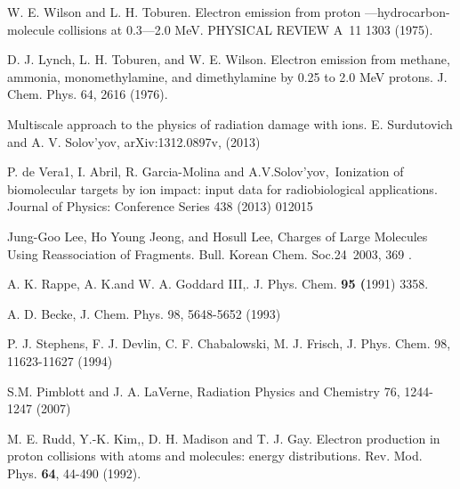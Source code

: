 \documentclass[preprint,12pt]{article}
\begin{document}
\begin{thebibliography}{99}
W. E. Wilson and L. H. Toburen. Electron emission from
proton ---hydrocarbon-molecule collisions at 0.3---2.0 MeV. PHYSICAL REVIEW
A\ 11 1303 (1975).

D. J. Lynch, L. H. Toburen, and W. E. Wilson. Electron
emission from methane, ammonia, monomethylamine, and dimethylamine by 0.25
to 2.0 MeV protons. J. Chem. Phys. 64, 2616 (1976).

Multiscale approach to the physics of radiation
damage with ions. E. Surdutovich and A. V. Solov'yov, arXiv:1312.0897v,
(2013)

P. de Vera1, I. Abril, R. Garcia-Molina and
A.V.Solov'yov,\ Ionization of biomolecular targets by ion impact: input data
for radiobiological applications. Journal of Physics: Conference Series 438
(2013) 012015

Jung-Goo Lee, Ho Young Jeong, and Hosull Lee, Charges of
Large Molecules Using Reassociation of Fragments. Bull. Korean Chem. Soc.24\
2003, 369 .

A. K. Rappe, A. K.and W. A. Goddard III,. J. Phys. Chem. 
\textbf{95 (}1991) 3358.

A. D. Becke, 
J. Chem. Phys. 98, 5648-5652 (1993) 

P. J. Stephens, F. J. Devlin, C. F. Chabalowski, M. J. Frisch,
J. Phys. Chem. 98, 11623-11627 (1994) 

S.M. Pimblott and J. A. LaVerne, Radiation
Physics and Chemistry 76, 1244-1247 (2007)

M. E. Rudd, Y.-K. Kim,, D. H. Madison and T. J. Gay.
Electron production in proton collisions with atoms and molecules: energy
distributions. Rev. Mod. Phys. \textbf{64}, 44-490 (1992).

\end{thebibliography}
\end{document}
